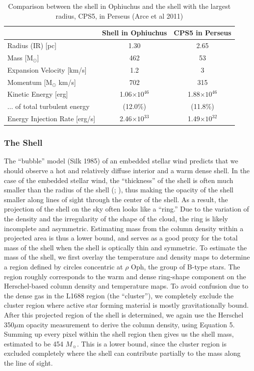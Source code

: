 \documentclass[11pt,a4paper]{emulateapj}
\begin{document}
\begin{table}[ht]
\centering
\begin{tabular}{lcc}
\hline
& \textbf{Shell in Ophiuchus} & \textbf{CPS5 in Perseus} \\   
\hline
Radius (IR) [pc] & 1.30 & 2.65 \\ 
Mass [M$_{\odot}$] & 462 & 53 \\ 
Expansion Velocity [km/s] & 1.2 & 3 \\ 
Momentum [M$_{\odot}$ km/s]& 702 & 315 \\ 
Kinetic Energy [erg]& 1.06$\times10^{46}$ & 1.88$\times10^{46}$ \\ 
... of total turbulent energy & (12.0\%) & (11.8\%) \\ 
Energy Injection Rate [erg/s] & 2.46$\times10^{33}$ & 1.49$\times10^{32}$ \\
\hline
\end{tabular}
\caption{Comparison between the shell in Ophiuchus and the shell with the largest radius, CPS5, in Perseus (Arce et al 2011)}
\end{table}

\subsubsection{The Shell}
The ``bubble'' model (Silk 1985) of an embedded stellar wind predicts that we should observe a hot and relatively diffuse interior and a warm dense shell. In the case of the embedded stellar wind, the ``thickness'' of the shell is often much smaller than the radius of the shell (\citet{Churchwell_2007}; \citet{Arce_2011}), thus making the opacity of the shell smaller along lines of sight through the center of the shell. As a result, the projection of the shell on the sky often looks like a ``ring.'' Due to the variation of the density and the irregularity of the shape of the cloud, the ring is likely incomplete and asymmetric. Estimating mass from the column density within a projected area is thus a lower bound, and serves as a good proxy for the total mass of the shell when the shell is optically thin and symmetric. To estimate the mass of the shell, we first overlay the temperature and density maps to determine a region defined by circles concentric at $\rho$ Oph, the group of B-type stars. The region roughly corresponds to the warm and dense ring-shape component on the Herschel-based column density and temperature maps. To avoid confusion due to the dense gas in the L1688 region (the ``cluster''), we completely exclude the cluster region where active star forming material is mostly gravitationally bound. After this projected region of the shell is determined, we again use the Herschel 350$\mu$m opacity measurement to derive the column density, using Equation 5. Summing up every pixel within the shell region then gives us the shell mass, estimated to be 454 $M_{\sun}$. This is a lower bound, since the cluster region is excluded completely where the shell can contribute partially to the mass along the line of sight.
\end{document}
